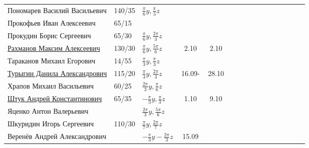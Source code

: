 \documentclass[a4paper,landscape,11pt]{article}
\begin{document}
\begin{tabular}{l|llccccccccccccc}
Пономарев Василий Васильевич	&140/35&$\frac{\pi}{6}y,\frac{\pi}{3}z$&       &\\
Прокофьев Иван Алексеевич	&65/15 &&       &\\	
Прокудин Борис Сергеевич	&65/30 &$\frac{\pi}{6}y,\frac{2\pi}{3}z$&       &\\	
\href{}{Рахманов Максим Алексеевич}	        &130/30&$\frac{\pi}{6}y,\frac{5\pi}{6}z$&2.10&2.10&\\	
Тараканов Михаил Егорович	&14/55&$\frac{\pi}{3}y,\frac{\pi}{3}z$&       &\\	
\href{}{Турыгин Данила Александрович}	        &115/20&$\frac{\pi}{3}y,\frac{2\pi}{3}z$&\,16.09-\,&28.10\\
Храпов Михаил Васильевич	&60/25 &$\frac{2\pi}{3}y,\frac{\pi}{6}z$&       &\\	
\midrule                                    
\href{}{Штук Андрей Константинович}	                &65/35 &$-\frac{\pi}{3}y,\frac{\pi}{3}z$&1.10&9.10\\	
Яценко Антон Валерьевич		&  &$\frac{2\pi}{3}y,\frac{5\pi}{6}z$&       &\\
Шкуридин Игорь Сергеевич	&110/30&$\frac{\pi}{7}y,\frac{2\pi}{7}z$&       &\\	
Веренёв Андрей Александрович	&  &$-\!\frac{\pi}{3}y\!-\!\frac{2\pi}{3}z\!$&\,15.09\,&\\
\bottomrule
\end{tabular}
\end{document}
